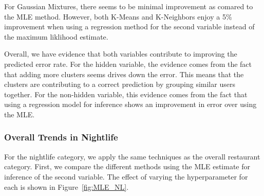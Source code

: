 \documentclass[11pt]{article}
\begin{document}
For Gaussian Mixtures, there seems to be minimal improvement as comared to the MLE method. However, both K-Means and K-Neighbors enjoy a 5\% improvement when using a regression method for the second variable instead of the maximum liklihood estimate.

Overall, we have evidence that both variables contribute to improving the predicted error rate. For the hidden variable, the evidence comes from the fact that adding more clusters seems drives down the error. This means that the clusters are contributing to a correct prediction by grouping similar users together. For the non-hidden variable, this evidence comes from the fact that using a regression model for inference shows an improvement in error over using the MLE.

\subsubsection{Overall Trends in Nightlife}
For the nightlife category, we apply the same techniques as the overall restaurant category. First, we compare the different methods using the MLE estimate for inference of the second variable. The effect of varying the hyperparameter for each is shown in Figure~\ref{fig:MLE_NL}.
\end{document}
